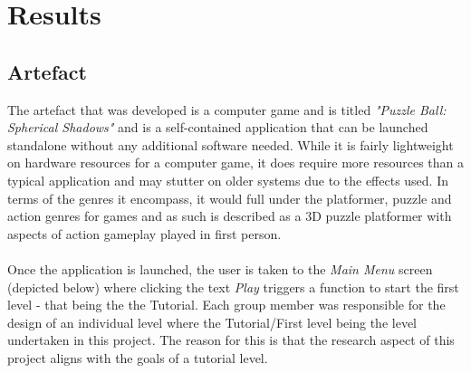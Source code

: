 
\chapter{Results} %

\label{Chapter4}  

\section{Artefact}
The artefact that was developed is a computer game and is titled \textit{"Puzzle Ball: Spherical Shadows"} and is a self-contained application that can be launched standalone without any additional software needed. While it is fairly lightweight on hardware resources for a computer game, it does require more resources than a typical application and may stutter on older systems due to the effects used. In terms of the genres it encompass, it would full under the platformer, puzzle and action genres for games and as such is described as a 3D puzzle platformer with aspects of action gameplay played in first person.
\\\\
Once the application is launched, the user is taken to the \textit{Main Menu} screen (depicted below) where clicking the text \textit{Play} triggers a function to start the first level - that being the the Tutorial. Each group member was responsible for the design of an individual level where the Tutorial/First level being the level undertaken in this project. The reason for this is that the research aspect of this project aligns with the goals of a tutorial level. 

